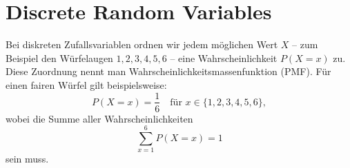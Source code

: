 \section{Discrete Random Variables}
Bei diskreten Zufallsvariablen ordnen wir jedem möglichen Wert \(X\) – zum Beispiel den Würfelaugen \(1,2,3,4,5,6\) – eine Wahrscheinlichkeit \(P(X=x)\) zu. Diese Zuordnung nennt man Wahrscheinlichkeitsmassenfunktion (PMF). Für einen fairen Würfel gilt beispielsweise:
\[
P(X=x) = \frac{1}{6} \quad \text{für } x \in \{1,2,3,4,5,6\},
\]
wobei die Summe aller Wahrscheinlichkeiten
\[
\sum_{x=1}^{6} P(X=x) = 1
\]
sein muss.